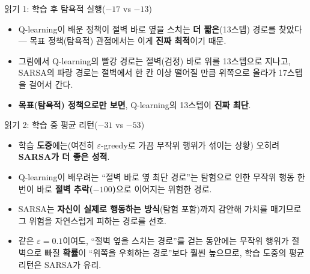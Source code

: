 \documentclass[aspectratio=169,11pt]{beamer}
\begin{document}
\begin{frame}{읽기 1: 학습 후 탐욕적 실행($-17$ vs $-13$)}
  \begin{itemize}
    \item Q-learning이 배운 정책이 절벽 바로 옆을 스치는
      \textbf{더 짧은}(13스텝) 경로를 찾았다 --- 목표 정책(탐욕적)
      관점에서는 이게 \textbf{진짜 최적}이기 때문.
    \item 그림에서 Q-learning의 빨강 경로는 절벽(검정) 바로 위를
      13스텝으로 지나고, SARSA의 파랑 경로는 절벽에서 한 칸 이상
      떨어질 만큼 위쪽으로 올라가 17스텝을 걸어서 간다.
    \item \textbf{목표(탐욕적) 정책으로만 보면}, Q-learning의 13스텝이
      \textbf{진짜 최단}.
  \end{itemize}
\end{frame}

\begin{frame}{읽기 2: 학습 중 평균 리턴($-31$ vs $-53$)}
  \begin{itemize}
    \item 학습 \textbf{도중}에는(여전히 $\varepsilon$-greedy로 가끔
      무작위 행위가 섞이는 상황) 오히려 \textbf{SARSA가 더 좋은
      성적}.
    \item Q-learning이 배우려는 ``절벽 바로 옆 최단 경로''는 탐험으로
      인한 무작위 행동 한 번이 바로 \textbf{절벽 추락($-100$)}으로
      이어지는 위험한 경로.
    \item SARSA는 \textbf{자신이 실제로 행동하는 방식}(탐험 포함)까지
      감안해 가치를 매기므로 그 위험을 자연스럽게 피하는 경로를
      선호.
    \item 같은 $\varepsilon=0.1$이여도, ``절벽 옆을 스치는 경로''를
      걷는 동안에는 무작위 행위가 절벽으로 빠질 \textbf{확률}이
      ``위쪽을 우회하는 경로''보다 훨씬 높으므로, 학습 도중의 평균
      리턴은 SARSA가 유리.
  \end{itemize}
\end{frame}
\end{document}
